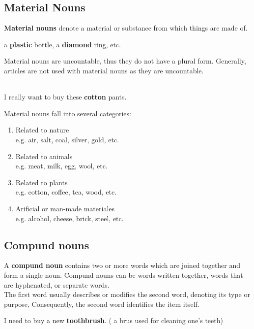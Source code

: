\documentclass[10pt,a4paper]{article}
\begin{document}
\newpage
\subsection{Material Nouns}
\textbf{Material nouns} denote a material or substance from which things are made of.
\begin{center}
		a \textbf{plastic} bottle, a \textbf{diamond} ring, etc.
\end{center}
Material nouns are uncountable, thus they do not have a plural form. Generally, articles are not used with material nouns as they are uncountable.
\begin{center}
		\\
		I really want to buy these \textbf{cotton} pants.
\end{center}

Material nouns fall into several categories:
\begin{center}
		\begin{enumerate}[label=\alph*)]]
		\item Related to nature\\
				e.g. air, salt, coal, silver, gold, etc.
		\item Related to animals\\
				e.g. meat, milk, egg, wool, etc.
		\item Related to plants\\
				e.g. cotton, coffee, tea, wood, etc.
		\item Arificial or man-made materiales\\
				e.g. alcohol, cheese, brick, steel, etc.
		\end{enumerate}
\end{center}

\subsection{Compund nouns}
A \textbf{compund noun} contains two or more words which are joined together and form a single noun. Compund nouns can be words written together, words that are hyphenated, or separate words.\\
The first word usually describes or modifies the second word, denoting its type or purpose, Consequently, the second word identifies the item itself.
\begin{center}
		I need to buy a new \textbf{toothbrush}. ( a brus used for cleaning one's teeth)
\end{center}
\end{document}
